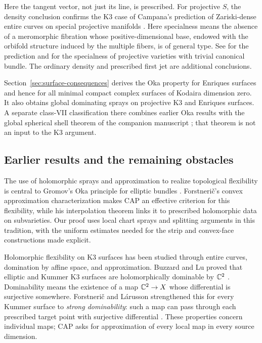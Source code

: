 Here the tangent vector, not just its line, is prescribed. For projective
$S$, the density conclusion confirms the K3 case of Campana's
prediction of Zariski-dense entire curves on special projective
manifolds \cite{Campana}. Here specialness means the absence of a
meromorphic fibration whose positive-dimensional base, endowed with
the orbifold structure induced by the multiple fibers, is of general
type.
See \cite[Conjecture~1.3]{CCR} for the prediction and
\cite[Proposition~8.9]{CCR} for the specialness of projective varieties
with trivial canonical bundle. The ordinary density and prescribed
first jet are additional conclusions.

Section~\ref{sec:surface-consequences} derives the Oka property for
Enriques surfaces and hence for all minimal compact complex surfaces
of Kodaira dimension zero. It also obtains global dominating sprays
on projective K3 and Enriques surfaces. A separate class-VII
classification there combines earlier Oka results with the global
spherical shell theorem of the companion manuscript \cite{OpenAIGSS};
that theorem is not an input to the K3 argument.

\subsection{Earlier results and the remaining obstacles}

The use of holomorphic sprays and approximation to realize topological
flexibility is central to Gromov's Oka principle for elliptic bundles
\cite{GromovOka}. Forstneri\v c's convex approximation characterization
\cite[Theorem~0.1]{ForstnericCAP} makes CAP an effective criterion for
this flexibility, while his interpolation theorem
\cite[Corollary~1.3]{ForstnericInterpolation} links it to prescribed
holomorphic data on subvarieties. Our proof uses local chart sprays
and splitting arguments in this tradition, with the uniform estimates
needed for the strip and convex-face constructions made explicit.

Holomorphic flexibility on K3 surfaces has been studied through entire
curves, domination by affine space, and approximation. Buzzard and Lu
proved that elliptic and Kummer K3 surfaces are holomorphically
dominable by $\mathbb C^2$ \cite[Propositions~4.4--4.5]{BuzzardLu}.
Dominability means the existence of a map $\mathbb C^2\to X$ whose
differential is surjective somewhere. Forstneri\v c and L\'arusson
strengthened this for every Kummer surface to \emph{strong
dominability}: such a map can pass through each prescribed target
point with surjective differential
\cite[Corollary~3]{ForstnericLarussonSurfaces}. These properties
concern individual maps; CAP asks for approximation of every local
map in every source dimension.

